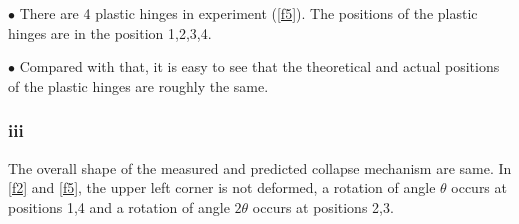 $\bullet$ There are 4 plastic hinges in experiment (\autoref{f5}). The positions of the plastic hinges are in the position 1,2,3,4.

$\bullet$ Compared with that, it is easy to see that the theoretical and actual positions of the plastic hinges are roughly the same.

\subsubsection*{iii}

The overall shape of the measured and predicted collapse mechanism are same. In \autoref{f2} and \autoref{f5}, the upper left corner is not deformed, a rotation of angle $\theta$ occurs at positions 1,4 and a rotation of angle $2\theta$ occurs at positions 2,3.